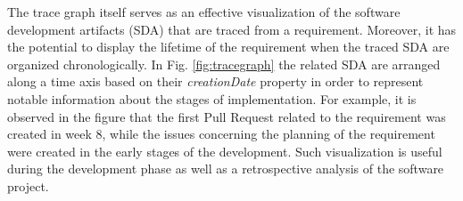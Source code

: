 The trace graph itself serves as an effective visualization of the software development artifacts (SDA) that are traced from a requirement. Moreover, it has the potential to display the lifetime of the requirement when the traced SDA are organized chronologically. In Fig. \ref{fig:tracegraph} the related SDA are arranged along a time axis based on their \textit{creationDate} property in order to represent notable information about the stages of implementation. For example, it is observed in the figure that the first Pull Request related to the requirement was created in week 8, while the issues concerning the planning of the requirement were created in the early stages of the development. Such visualization is useful during the development phase as well as a retrospective analysis of the software project.













